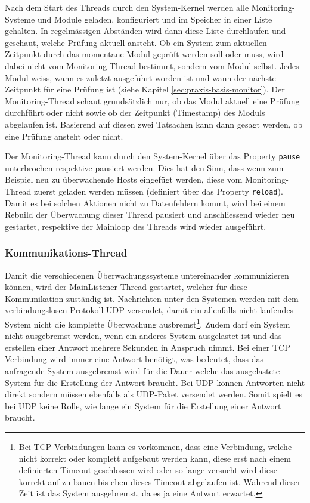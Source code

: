 Nach dem Start des Threads durch den System-Kernel werden alle Monitoring-Systeme und Module geladen, konfiguriert und im Speicher in einer Liste gehalten. In regelm\"assigen Abst\"anden wird dann diese Liste durchlaufen und geschaut, welche Pr\"ufung aktuell ansteht. Ob ein System zum aktuellen Zeitpunkt durch das momentane Modul gepr\"uft werden soll oder muss, wird dabei nicht vom Monitoring-Thread bestimmt, sondern vom Modul selbst. Jedes Modul weiss, wann es zuletzt ausgef\"uhrt worden ist und wann der n\"achste Zeitpunkt f\"ur eine Pr\"ufung ist (siehe Kapitel \ref{sec:praxis-basis-monitor}). Der Monitoring-Thread schaut grunds\"atzlich nur, ob das Modul aktuell eine Pr\"ufung durchf\"uhrt oder nicht sowie ob der Zeitpunkt (Timestamp) des Moduls abgelaufen ist. Basierend auf diesen zwei Tatsachen kann dann gesagt werden, ob eine Pr\"ufung ansteht oder nicht.

Der Monitoring-Thread kann durch den System-Kernel \"uber das Property \texttt{pause} unterbrochen respektive pausiert werden. Dies hat den Sinn, dass wenn zum Beispiel neu zu \"uberwachende Hosts eingef\"ugt werden, diese vom Monitoring-Thread zuerst geladen werden m\"ussen (definiert \"uber das Property \texttt{reload}). Damit es bei solchen Aktionen nicht zu Datenfehlern kommt, wird bei einem Rebuild der \"Uberwachung dieser Thread pausiert und anschliessend wieder neu gestartet, respektive der Mainloop des Threads wird wieder ausgef\"uhrt.

\subsubsection{Kommunikations-Thread} \label{sec:praxis-basis-kernel-listener}
Damit die verschiedenen \"Uberwachungssysteme untereinander kommunizieren k\"onnen, wird der MainListener-Thread gestartet, welcher f\"ur diese Kommunikation zust\"andig ist. Nachrichten unter den Systemen werden mit dem verbindungslosen Protokoll UDP versendet, damit ein allenfalls nicht laufendes System nicht die komplette \"Uberwachung ausbremst\footnote{Bei TCP-Verbindungen kann es vorkommen, dass eine Verbindung, welche nicht korrekt oder komplett aufgebaut werden kann, diese erst nach einem definierten Timeout geschlossen wird oder so lange versucht wird diese korrekt auf zu bauen bis eben dieses Timeout abgelaufen ist. W\"ahrend dieser Zeit ist das System ausgebremst, da es ja eine Antwort erwartet.}. Zudem darf ein System nicht ausgebremst werden, wenn ein anderes System ausgelastet ist und das erstellen einer Antwort mehrere Sekunden in Anspruch nimmt. Bei einer TCP Verbindung wird immer eine Antwort ben\"otigt, was bedeutet, dass das anfragende System ausgebremst wird f\"ur die Dauer welche das ausgelastete System f\"ur die Erstellung der Antwort braucht. Bei UDP k\"onnen Antworten nicht direkt sondern m\"ussen ebenfalls als UDP-Paket versendet werden. Somit spielt es bei UDP keine Rolle, wie lange ein System f\"ur die Erstellung einer Antwort braucht.

